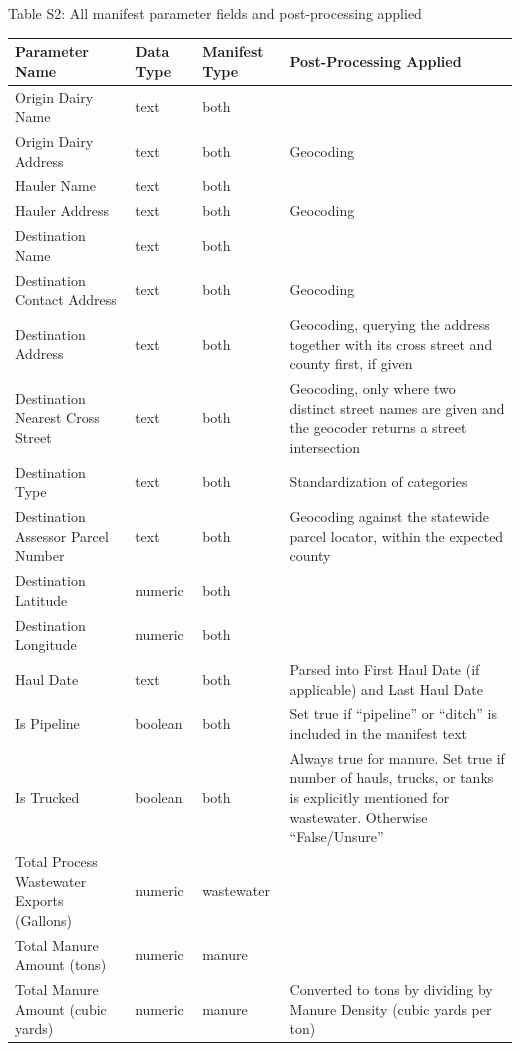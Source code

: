 \documentclass{iopjournal}
\begin{document}
Table S2: All manifest parameter fields and post-processing applied

\begin{longtable}{| >{\raggedright\arraybackslash}p{4.5cm} | l | >{\raggedright\arraybackslash}p{2cm} | >{\raggedright\arraybackslash}p{4.5cm} |}
\hline
\textbf{Parameter Name} & \textbf{Data Type} & \textbf{Manifest Type} & \textbf{Post-Processing Applied} \\
\hline
Origin Dairy Name & text & both &  \\
\hline
Origin Dairy Address & text & both & Geocoding \\
\hline
Hauler Name & text & both &  \\
\hline
Hauler Address & text & both & Geocoding \\
\hline
Destination Name & text & both &  \\
\hline
Destination Contact Address & text & both & Geocoding \\
\hline
Destination Address & text & both & Geocoding, querying the address together with its cross street and county first, if given \\
\hline
Destination Nearest Cross Street & text & both & Geocoding, only where two distinct street names are given and the geocoder returns a street intersection \\
\hline
Destination Type & text & both & Standardization of categories \\
\hline
Destination Assessor Parcel Number & text & both & Geocoding against the statewide parcel locator, within the expected county \\
\hline
Destination Latitude & numeric & both &  \\
\hline
Destination Longitude & numeric & both &  \\
\hline
Haul Date & text & both & Parsed into First Haul Date (if applicable) and Last Haul Date \\
\hline
Is Pipeline & boolean & both & Set true if ``pipeline'' or ``ditch'' is included in the manifest text \\
\hline
Is Trucked & boolean & both & Always true for manure. Set true if number of hauls, trucks, or tanks is explicitly mentioned for wastewater. Otherwise ``False/Unsure'' \\
\hline
Total Process Wastewater Exports (Gallons) & numeric & wastewater &  \\
\hline
Total Manure Amount (tons) & numeric & manure &  \\
\hline
Total Manure Amount (cubic yards) & numeric & manure & Converted to tons by dividing by Manure Density (cubic yards per ton) \\

\end{longtable}
\end{document}

